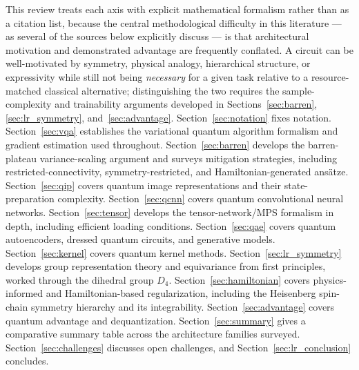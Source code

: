 \documentclass[11pt]{article}
\begin{document}
This review treats each axis with explicit mathematical formalism rather than as a citation list, because the central methodological difficulty in this literature — as several of the sources below explicitly discuss \cite{Huang2021PowerData,Cotler2021,Gyurik2023} — is that architectural motivation and demonstrated advantage are frequently conflated. A circuit can be well-motivated by symmetry, physical analogy, hierarchical structure, or expressivity while still not being \emph{necessary} for a given task relative to a resource-matched classical alternative; distinguishing the two requires the sample-complexity and trainability arguments developed in Sections~\ref{sec:barren}, \ref{sec:lr_symmetry}, and~\ref{sec:advantage}. Section~\ref{sec:notation} fixes notation. Section~\ref{sec:vqa} establishes the variational quantum algorithm formalism and gradient estimation used throughout. Section~\ref{sec:barren} develops the barren-plateau variance-scaling argument and surveys mitigation strategies, including restricted-connectivity, symmetry-restricted, and Hamiltonian-generated ansätze. Section~\ref{sec:qip} covers quantum image representations and their state-preparation complexity. Section~\ref{sec:qcnn} covers quantum convolutional neural networks. Section~\ref{sec:tensor} develops the tensor-network/MPS formalism in depth, including efficient loading conditions. Section~\ref{sec:qae} covers quantum autoencoders, dressed quantum circuits, and generative models. Section~\ref{sec:kernel} covers quantum kernel methods. Section~\ref{sec:lr_symmetry} develops group representation theory and equivariance from first principles, worked through the dihedral group $D_4$. Section~\ref{sec:hamiltonian} covers physics-informed and Hamiltonian-based regularization, including the Heisenberg spin-chain symmetry hierarchy and its integrability. Section~\ref{sec:advantage} covers quantum advantage and dequantization. Section~\ref{sec:summary} gives a comparative summary table across the architecture families surveyed. Section~\ref{sec:challenges} discusses open challenges, and Section~\ref{sec:lr_conclusion} concludes.
\end{document}

